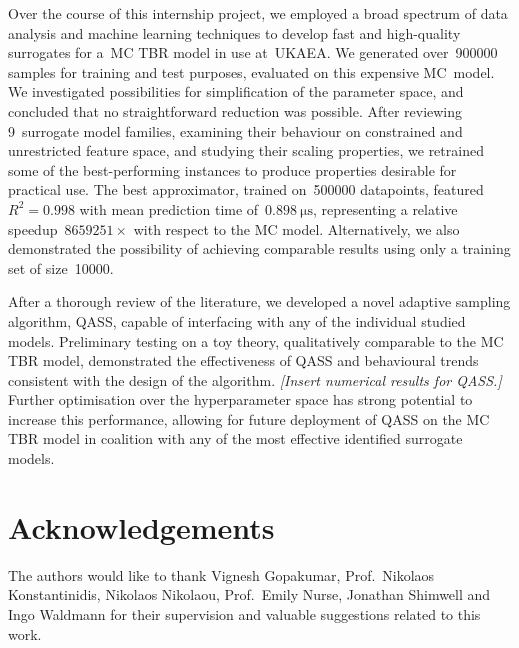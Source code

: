 Over the course of this internship project, we employed a broad spectrum of data
analysis and machine learning techniques to develop fast and high-quality
surrogates for a~MC TBR model in use at~UKAEA. We generated over~\num{900000}
samples for training and test purposes, evaluated on this expensive MC~model. We
investigated possibilities for simplification of the parameter space, and
concluded that no straightforward reduction was possible. After reviewing
9~surrogate model families, examining their behaviour on constrained and
unrestricted feature space, and studying their scaling properties, we retrained
some of the best-performing instances to produce properties desirable for
practical use. The best approximator, trained on~\num{500000} datapoints,
featured~$R^2=\num{0.998}$ with mean prediction time
of~$\SI{0.898}{\micro\second}$, representing a relative
speedup~$\num{8659251} \times$ with respect to the MC model. Alternatively, we
also demonstrated the possibility of achieving comparable results using only a
training set of size~\num{10000}.

After a thorough review of the literature, we developed a novel adaptive
sampling algorithm, QASS, capable of interfacing with any of the individual
studied models. Preliminary testing on a toy theory, qualitatively comparable to
the MC TBR model, demonstrated the effectiveness of QASS and behavioural trends
consistent with the design of the algorithm. \textit{[Insert numerical results
for QASS.]} Further optimisation over the hyperparameter space has strong
potential to increase this performance, allowing for future deployment of QASS
on the MC TBR model in coalition with any of the most effective identified
surrogate models.


\section*{Acknowledgements}

The authors would like to thank Vignesh Gopakumar, Prof.~Nikolaos
Konstantinidis, Nikolaos Nikolaou, Prof.~Emily Nurse, Jonathan Shimwell and Ingo
Waldmann for their supervision and valuable suggestions related to this work.

